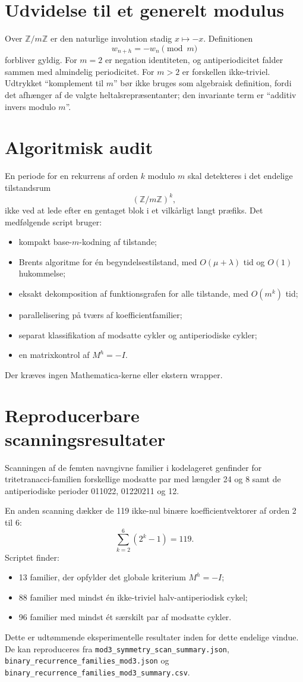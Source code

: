 \documentclass[11pt,a4paper]{article}
\newcommand{\Z}{\mathbb{Z}}
\begin{document}
\section{Udvidelse til et generelt modulus}
Over $\Z/m\Z$ er den naturlige involution stadig $x\mapsto-x$. Definitionen
\[
w_{n+h}=-w_n\pmod m
\]
forbliver gyldig. For $m=2$ er negation identiteten, og antiperiodicitet falder sammen med almindelig periodicitet. For $m>2$ er forskellen ikke-triviel. Udtrykket ``komplement til $m$'' bør ikke bruges som algebraisk definition, fordi det afhænger af de valgte heltalsrepræsentanter; den invariante term er ``additiv invers modulo $m$''.

\clearpage
\section{Algoritmisk audit}
En periode for en rekurrens af orden $k$ modulo $m$ skal detekteres i det endelige tilstandsrum
\[
(\Z/m\Z)^k,
\]
ikke ved at lede efter en gentaget blok i et vilkårligt langt præfiks. Det medfølgende script bruger:
\begin{itemize}
\item kompakt base-$m$-kodning af tilstande;
\item Brents algoritme for én begyndelsestilstand, med $O(\mu+\lambda)$ tid og $O(1)$ hukommelse;
\item eksakt dekomposition af funktionsgrafen for alle tilstande, med $O(m^k)$ tid;
\item parallelisering på tværs af koefficientfamilier;
\item separat klassifikation af modsatte cykler og antiperiodiske cykler;
\item en matrixkontrol af $M^h=-I$.
\end{itemize}
Der kræves ingen Mathematica-kerne eller ekstern wrapper.

\section{Reproducerbare scanningsresultater}
Scanningen af de femten navngivne familier i kodelageret genfinder for tritetranacci-familien forskellige modsatte par med længder 24 og 8 samt de antiperiodiske perioder 011022, 01220211 og 12.

En anden scanning dækker de 119 ikke-nul binære koefficientvektorer af orden 2 til 6:
\[
\sum_{k=2}^{6}(2^k-1)=119.
\]
Scriptet finder:
\begin{itemize}
\item 13 familier, der opfylder det globale kriterium $M^h=-I$;
\item 88 familier med mindst én ikke-triviel halv-antiperiodisk cykel;
\item 96 familier med mindst ét særskilt par af modsatte cykler.
\end{itemize}
Dette er udtømmende eksperimentelle resultater inden for dette endelige vindue. De kan reproduceres fra \nolinkurl{mod3_symmetry_scan_summary.json}, \nolinkurl{binary_recurrence_families_mod3.json} og \nolinkurl{binary_recurrence_families_mod3_summary.csv}.
\end{document}
